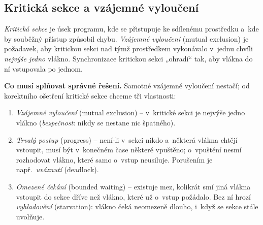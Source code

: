 \begin{center}
%
\end{center}

\subsection{Kritická sekce a vzájemné vyloučení}

\begin{definice}
\emph{Kritická sekce} je úsek programu, kde se přistupuje ke sdílenému prostředku a~kde by souběžný přístup způsobil chybu. \emph{Vzájemné vyloučení} (mutual exclusion) je požadavek, aby kritickou sekci nad týmž prostředkem vykonávalo v~jednu chvíli \emph{nejvýše jedno} vlákno. Synchronizace kritickou sekci „ohradí`` tak, aby vlákna do ní vstupovala po jednom.
\end{definice}

\begin{intuice}
\textbf{Co musí splňovat správné řešení.} Samotné vzájemné vyloučení nestačí; od korektního ošetření kritické sekce chceme tři vlastnosti:
\begin{enumerate}[label=(\arabic*)]
  \item \emph{Vzájemné vyloučení} (mutual exclusion) -- v~kritické sekci je nejvýše jedno vlákno (\emph{bezpečnost}: nikdy se nestane nic špatného).
  \item \emph{Trvalý postup} (progress) -- není-li v~sekci nikdo a~některá vlákna chtějí vstoupit, musí být v~konečném čase některé vpuštěno; o~vpuštění nesmí rozhodovat vlákno, které samo o~vstup neusiluje. Porušením je např.\ \emph{uváznutí} (deadlock).
  \item \emph{Omezené čekání} (bounded waiting) -- existuje mez, kolikrát smí jiná vlákna vstoupit do sekce dříve než vlákno, které už o~vstup požádalo. Bez ní hrozí \emph{vyhladovění} (starvation): vlákno čeká neomezeně dlouho, i~když se sekce stále uvolňuje.
\end{enumerate}
\end{intuice}

